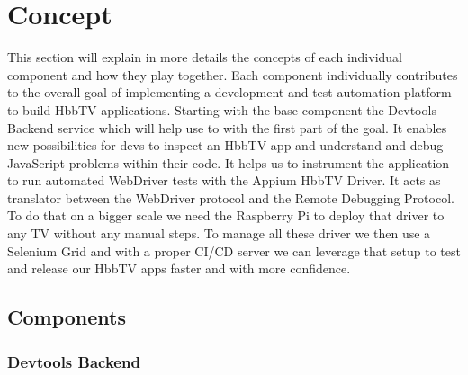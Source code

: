 %
%

\chapter{Concept\label{cha:concept}}

This section will explain in more details the concepts of each individual component and how they
play together. Each component individually contributes to the overall goal of implementing a
development and test automation platform to build HbbTV applications. Starting with the base
component the Devtools Backend service which will help use to with the first part of the goal.
It enables new possibilities for devs to inspect an HbbTV app and understand and debug JavaScript
problems within their code. It helps us to instrument the application to run automated WebDriver
tests with the Appium HbbTV Driver. It acts as translator between the WebDriver protocol
and the Remote Debugging Protocol. To do that on a bigger scale we need the Raspberry Pi to deploy
that driver to any TV without any manual steps. To manage all these driver we then use a Selenium
Grid and with a proper CI/CD server we can leverage that setup to test and release our HbbTV apps
faster and with more confidence.

\section{Components\label{sec:components}}

\subsection{Devtools Backend\label{sec:devtoolsbackend}}

